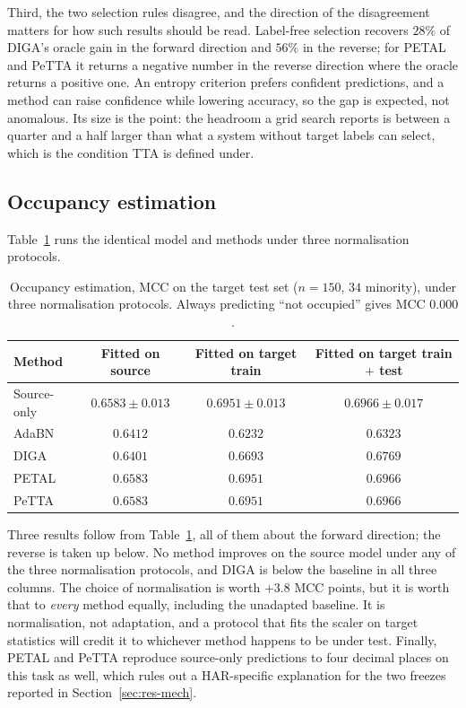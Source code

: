 \documentclass[a4paper,fleqn]{cas-dc}
\begin{document}
Third, the two selection rules disagree, and the direction of the disagreement matters for
how such results should be read. Label-free selection recovers $28\%$ of DIGA's oracle gain
in the forward direction and $56\%$ in the reverse; for PETAL and PeTTA it returns a
negative number in the reverse direction where the oracle returns a positive one. An
entropy criterion prefers confident predictions, and a method can raise confidence while
lowering accuracy, so the gap is expected, not anomalous. Its size is the point: the
headroom a grid search reports is between a quarter and a half larger than what a system
without target labels can select, which is the condition TTA is defined under.

\subsection{Occupancy estimation}
\label{sec:res-oe}

Table~\ref{tab:oe} runs the identical model and methods under three normalisation
protocols.

\begin{table}[t]
\centering
\caption{Occupancy estimation, MCC on the target test set ($n=150$, $34$ minority), under
three normalisation protocols. Always predicting ``not occupied'' gives MCC $0.000$.}
\label{tab:oe}
\begin{tabular}{lccc}
\toprule
Method & Fitted on source & Fitted on target train & Fitted on target train $+$ test \\
\midrule
Source-only & $\mathbf{0.6583}\pm0.013$ & $\mathbf{0.6951}\pm0.013$ & $\mathbf{0.6966}\pm0.017$ \\
AdaBN       & $0.6412$ & $0.6232$ & $0.6323$ \\
DIGA        & $0.6401$ & $0.6693$ & $0.6769$ \\
PETAL       & $0.6583$ & $0.6951$ & $0.6966$ \\
PeTTA       & $0.6583$ & $0.6951$ & $0.6966$ \\
\bottomrule
\end{tabular}
\end{table}

Three results follow from Table~\ref{tab:oe}, all of them about the forward direction;
the reverse is taken up below. No method improves on the source model under any of the
three normalisation protocols, and DIGA is below the baseline in all three columns. The choice of normalisation is worth $+3.8$ MCC
points, but it is worth that to \emph{every} method equally, including the unadapted
baseline. It is normalisation, not adaptation, and a protocol that fits the scaler on
target statistics will credit it to whichever method happens to be under test. Finally,
PETAL and PeTTA reproduce
source-only predictions to four decimal places on this task as well, which rules out a
HAR-specific explanation for the two freezes reported in Section~\ref{sec:res-mech}.
\end{document}
